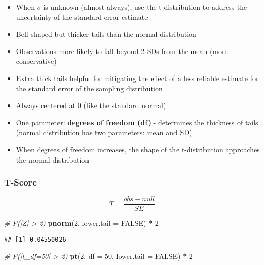 \documentclass[]{book}
\newenvironment{Shaded}{\begin{snugshade}}{\end{snugshade}}
\newcommand{\CommentTok}[1]{\textcolor[rgb]{0.56,0.35,0.01}{\textit{#1}}}
\newcommand{\DataTypeTok}[1]{\textcolor[rgb]{0.13,0.29,0.53}{#1}}
\newcommand{\DecValTok}[1]{\textcolor[rgb]{0.00,0.00,0.81}{#1}}
\newcommand{\KeywordTok}[1]{\textcolor[rgb]{0.13,0.29,0.53}{\textbf{#1}}}
\newcommand{\NormalTok}[1]{#1}
\newcommand{\OperatorTok}[1]{\textcolor[rgb]{0.81,0.36,0.00}{\textbf{#1}}}
\newcommand{\OtherTok}[1]{\textcolor[rgb]{0.56,0.35,0.01}{#1}}
\newcommand{\StringTok}[1]{\textcolor[rgb]{0.31,0.60,0.02}{#1}}
\begin{document}
\begin{itemize}
\item
  When \(\sigma\) is unknown (almost always), use the t-distribution to address
  the uncertainty of the standard error estimate
\item
  Bell shaped but thicker tails than the normal distribution
\item
  Observations more likely to fall beyond 2 SDs from the mean (more conservative)
\item
  Extra thick tails helpful for mitigating the effect of a less reliable estimate for the standard error of the sampling distribution
\item
  Always centered at 0 (like the standard normal)
\item
  One parameter: \textbf{degrees of freedom (df)} - determines the thickness of tails (normal distribution has two parameters: mean and SD)
\item
  When degrees of freedom increases, the shape of the t-distribution approaches the normal distribution
\end{itemize}

\hypertarget{t-score}{%
\subsubsection*{T-Score}\label{t-score}}

\[
T = \frac{obs-null}{SE}
\]

\begin{Shaded}
\begin{Highlighting}[]
\CommentTok{# P(|Z| > 2)}
\KeywordTok{pnorm}\NormalTok{(}\DecValTok{2}\NormalTok{, }\DataTypeTok{lower.tail =} \OtherTok{FALSE}\NormalTok{) }\OperatorTok{*}\StringTok{ }\DecValTok{2}
\end{Highlighting}
\end{Shaded}

\begin{verbatim}
## [1] 0.04550026
\end{verbatim}

\begin{Shaded}
\begin{Highlighting}[]
\CommentTok{# P(|t_df=50| > 2)}
\KeywordTok{pt}\NormalTok{(}\DecValTok{2}\NormalTok{, }\DataTypeTok{df =} \DecValTok{50}\NormalTok{, }\DataTypeTok{lower.tail =} \OtherTok{FALSE}\NormalTok{) }\OperatorTok{*}\StringTok{ }\DecValTok{2}
\end{Highlighting}
\end{Shaded}
\end{document}
